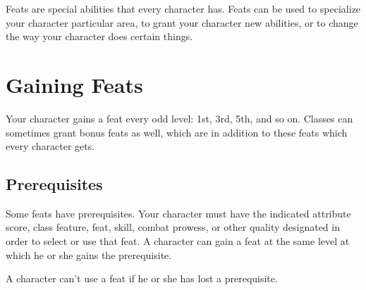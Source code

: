 
Feats are special abilities that every character has.
Feats can be used to specialize your character particular area, to grant your character new abilities, or to change the way your character does certain things.

\section{Gaining Feats}
Your character gains a feat every odd level: 1st, 3rd, 5th, and so on.
Classes can sometimes grant bonus feats as well, which are in addition to these feats which every character gets.

\subsection{Prerequisites}
Some feats have prerequisites.
Your character must have the indicated attribute score, class feature, feat, skill, combat prowess, or other quality designated in order to select or use that feat.
A character can gain a feat at the same level at which he or she gains the prerequisite.

A character can't use a feat if he or she has lost a prerequisite.

